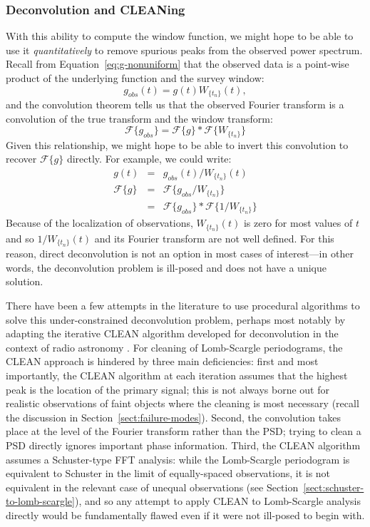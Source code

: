 \documentclass[preprint]{aastex}
\newcommand{\Eq}[1]{Equation~\ref{eq:#1}}
\newcommand{\eq}[1]{\Eq{#1}}
\newcommand{\Sect}[1]{Section~\ref{sect:#1}}
\newcommand{\sect}[1]{\Sect{#1}}
\newcommand{\sectlabel}[1]{\label{sect:#1}}
\begin{document}
\subsubsection{Deconvolution and CLEANing}
\sectlabel{CLEAN}
With this ability to compute the window function, we might hope to be able to
use it {\it quantitatively} to remove spurious peaks from the observed
power spectrum.
Recall from \eq{g-nonuniform} that the observed data is a point-wise product
of the underlying function and the survey window:
\begin{equation}
  g_{obs}(t) = g(t)W_{\{t_n\}}(t),
\end{equation}
and the convolution theorem tells us that the observed Fourier transform is
a convolution of the true transform and the window transform:
\begin{equation}
  \mathcal{F}\{g_{obs}\} = \mathcal{F}\{g\} \ast \mathcal{F}\{W_{\{t_n\}}\}
\end{equation}
Given this relationship, we might hope to be able to invert this
convolution to recover $\mathcal{F}\{g\}$ directly.
For example, we could write:
\begin{eqnarray}
  g(t) &=& g_{obs}(t) / W_{\{t_n\}}(t)\nonumber\\
  \mathcal{F}\{g\} &=& \mathcal{F}\{g_{obs}/W_{\{t_n\}}\}\nonumber\\
                   &=& \mathcal{F}\{g_{obs}\} \ast \mathcal{F}\{1/W_{\{t_n\}}\}
\end{eqnarray}
Because of the localization of observations, $W_{\{t_n\}}(t)$ is zero for most
values of $t$ and so $1/W_{\{t_n\}}(t)$ and its Fourier transform are not well
defined. For this reason, direct deconvolution is not an option in most
cases of interest---in other words, the deconvolution problem is ill-posed
and does not have a unique solution.

There have been a few attempts in the literature to use procedural algorithms
to solve this under-constrained deconvolution problem, perhaps most notably
by adapting the iterative CLEAN algorithm developed for deconvolution in the
context of radio astronomy \citep{Roberts87}.
For cleaning of Lomb-Scargle periodograms, the CLEAN approach is hindered by
three main deficiencies: first and most importantly, the CLEAN algorithm at each
iteration assumes that the highest peak is the location of the primary signal;
this is not always borne out for realistic observations of faint objects where
the cleaning is most necessary (recall the discussion in \sect{failure-modes}).
Second, the convolution takes place at the level of the Fourier transform
rather than the PSD; trying to clean a PSD directly ignores important phase
information. Third, the CLEAN algorithm assumes a Schuster-type FFT analysis:
while the Lomb-Scargle periodogram is equivalent to Schuster in the limit of
equally-spaced observations, it is not equivalent in the relevant case of
unequal observations (see \sect{schuster-to-lomb-scargle}),
and so any attempt to apply CLEAN to Lomb-Scargle analysis directly would
be fundamentally flawed even if it were not ill-posed to begin with.
\end{document}
